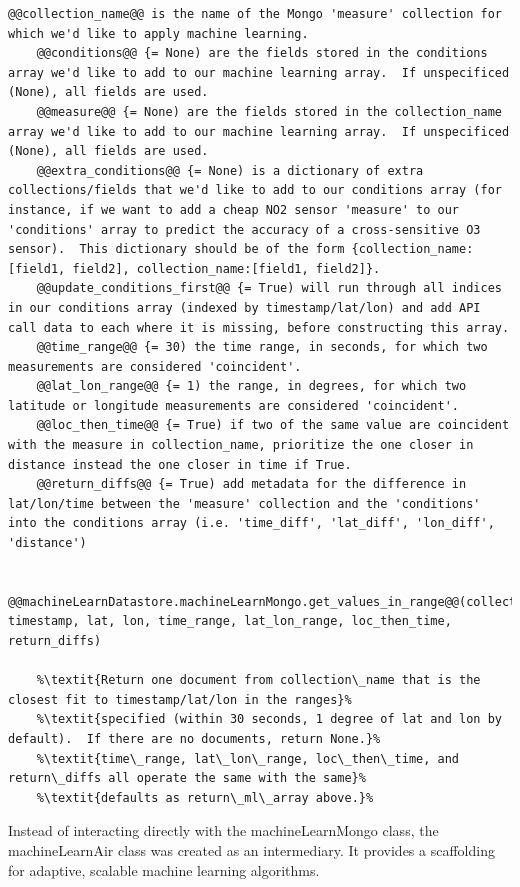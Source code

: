 \begin{lstlisting}[style=codedef]
	@@collection_name@@ is the name of the Mongo 'measure' collection for which we'd like to apply machine learning.
	@@conditions@@ {= None) are the fields stored in the conditions array we'd like to add to our machine learning array.  If unspecificed (None), all fields are used.
	@@measure@@ {= None) are the fields stored in the collection_name array we'd like to add to our machine learning array.  If unspecificed (None), all fields are used.
	@@extra_conditions@@ {= None) is a dictionary of extra collections/fields that we'd like to add to our conditions array (for instance, if we want to add a cheap NO2 sensor 'measure' to our 'conditions' array to predict the accuracy of a cross-sensitive O3 sensor).  This dictionary should be of the form {collection_name:[field1, field2], collection_name:[field1, field2]}.
	@@update_conditions_first@@ {= True) will run through all indices in our conditions array (indexed by timestamp/lat/lon) and add API call data to each where it is missing, before constructing this array.
	@@time_range@@ {= 30) the time range, in seconds, for which two measurements are considered 'coincident'.
	@@lat_lon_range@@ {= 1) the range, in degrees, for which two latitude or longitude measurements are considered 'coincident'.
	@@loc_then_time@@ {= True) if two of the same value are coincident with the measure in collection_name, prioritize the one closer in distance instead the one closer in time if True.
	@@return_diffs@@ {= True) add metadata for the difference in lat/lon/time between the 'measure' collection and the 'conditions' into the conditions array (i.e. 'time_diff', 'lat_diff', 'lon_diff', 'distance')

	
@@machineLearnDatastore.machineLearnMongo.get_values_in_range@@(collection_name, timestamp, lat, lon, time_range, lat_lon_range, loc_then_time, return_diffs)

	%\textit{Return one document from collection\_name that is the closest fit to timestamp/lat/lon in the ranges}%
	%\textit{specified (within 30 seconds, 1 degree of lat and lon by default).  If there are no documents, return None.}%
	%\textit{time\_range, lat\_lon\_range, loc\_then\_time, and return\_diffs all operate the same with the same}%
	%\textit{defaults as return\_ml\_array above.}%
\end{lstlisting}


Instead of interacting directly with the machineLearnMongo class, the machineLearnAir class was created as an intermediary.  It provides a scaffolding for adaptive, scalable machine learning algorithms.  

